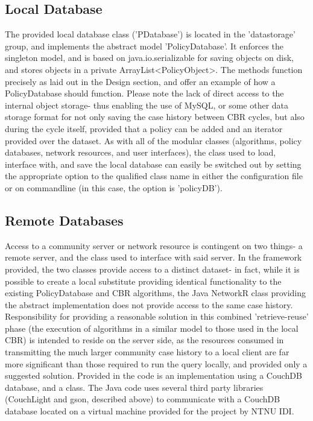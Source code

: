 \subsection{Local Database}
The provided local database class ('PDatabase') is located in the 'datastorage' group, and implements the abstract model 'PolicyDatabase'. It enforces the singleton model, and is based on java.io.serializable for saving objects on disk, and stores objects in a private ArrayList<PolicyObject>. The methods function precisely as laid out in the Design section, and offer an example of how a PolicyDatabase should function.
Please note the lack of direct access to the internal object storage- thus enabling the use of MySQL, or some other data storage format for not only saving the case history between CBR cycles, but also during the cycle itself, provided that a policy can be added and an iterator provided over the dataset.
As with all of the modular classes (algorithms, policy databases, network resources, and user interfaces), the class used to load, interface with, and save the local database can easily be switched out by setting the appropriate  option to the qualified class name in either the configuration file or on commandline (in this case, the option is 'policyDB').

\subsection{Remote Databases}  %
Access to a community server or network resource is contingent on two things- a remote server, and the class used to interface with said server. In the framework provided, the two classes provide access to a distinct dataset- in fact, while it is possible to create a local substitute providing identical functionality to the existing PolicyDatabase and CBR algorithms, the Java NetworkR class providing the abstract implementation does not provide access to the same case history. Responsibility for providing a reasonable solution in this combined 'retrieve-reuse' phase (the execution of algorithms in a similar model to those used in the local CBR) is intended to reside on the server side, as the resources consumed in transmitting the much larger community case history to a local client are far more significant than those required to run the query locally, and provided only a suggested solution.
Provided in the code is an implementation using a CouchDB database, and a class. The Java code uses several third party libraries (CouchLight and gson, described above) to communicate with a CouchDB database located on a virtual machine provided for the project by NTNU IDI.


